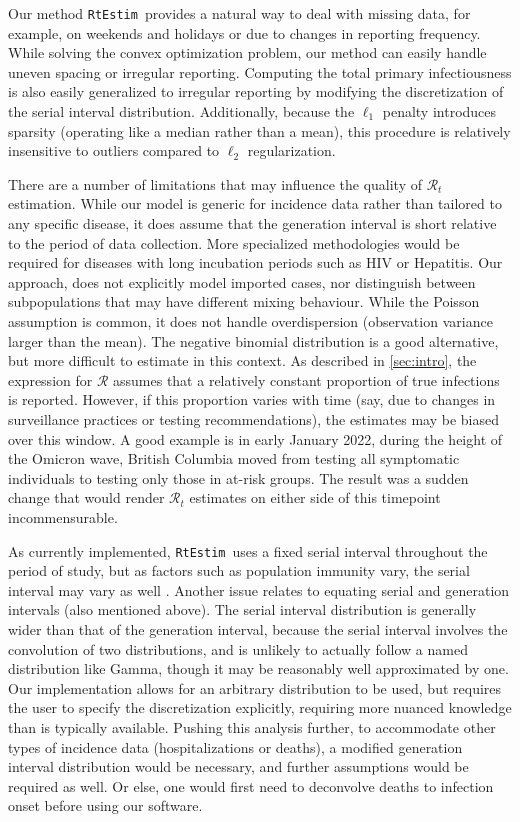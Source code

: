\documentclass[10pt,letterpaper]{article}
\def\RtEstim{\texttt{RtEstim}}
\def\calR{\mathcal{R}}
\newcommand{\citep}[1]{\cite{#1}}
\begin{document}
Our method \RtEstim\ provides a natural way to deal with missing data, for
example, on weekends and holidays or due to changes in reporting frequency.
While solving the convex optimization problem, our method can easily 
handle uneven spacing or irregular reporting. Computing the total
primary infectiousness is also easily generalized to irregular reporting by
modifying the discretization of the serial interval distribution. Additionally,
because the $\ell_1$ penalty introduces sparsity (operating like a median
rather than a mean), this procedure is relatively insensitive to outliers
compared to $\ell_2$ regularization.


There are a number of limitations that may influence the quality of
$\calR_t$ estimation. While our model is generic for incidence data 
rather than tailored to any specific disease, it does assume that the 
generation interval is short relative to the period of data collection. 
More specialized methodologies would be required for diseases with long 
incubation periods such as HIV or Hepatitis. 
Our approach, does not explicitly model imported cases, nor distinguish between
subpopulations that may have different mixing behaviour. 
While the Poisson assumption is common, it does not handle overdispersion
(observation variance larger than the mean). The negative binomial distribution
is a good alternative, but more difficult to estimate in this context.
As described in \autoref{sec:intro}, the expression for $\calR$ 
assumes that a relatively constant proportion of true infections is reported. 
However, if this proportion varies with time (say, due to changes in surveillance
practices or testing recommendations), the estimates may be biased over this
window. A good example is in early January 2022, during the height of the
Omicron wave, British Columbia moved from testing all symptomatic individuals to
testing only those in at-risk groups. The result was a sudden change that would
render $\calR_t$ estimates on either side of this timepoint incommensurable.


As currently implemented, \RtEstim\ uses a fixed serial interval throughout the
period of study, but as factors such as population immunity vary, the serial
interval may vary as well \citep{nash2023estimating}.  
Another issue relates to equating serial and generation intervals (also
mentioned above). The serial interval distribution is generally wider than that
of the generation interval, because the serial interval involves the convolution
of two distributions, and is unlikely to actually follow a named distribution
like Gamma, though it may be reasonably well approximated by one. Our
implementation allows for an arbitrary distribution to be used, but requires the
user to specify the discretization explicitly, requiring more nuanced knowledge
than is typically available. Pushing this analysis further, to accommodate other
types of incidence data (hospitalizations or deaths), a modified generation
interval distribution would be necessary, and further assumptions would be
required as well. Or else, one would first need to deconvolve deaths to
infection onset before using our software.
\end{document}

